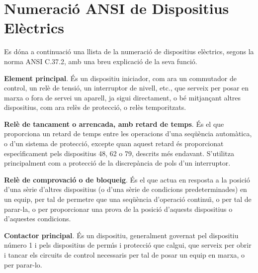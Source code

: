 \chapter{Numeraci\'{o} \textsf{ANSI} de Dispositius El\`{e}ctrics} 

Es d\'{o}na a continuaci\'{o} una llista de la numeraci\'{o} de dispositius
el\`{e}ctrics, segons la norma \textsf{ANSI C.37.2}, amb una breu
explicaci\'{o} de la seva funci\'{o}.

\begin{multicols}{2}
\begin{list}{}
{\setlength{\labelwidth}{6mm} \setlength{\leftmargin}{6mm}
\setlength{\labelsep}{2mm}}

\item[\textbf{1}]  \textbf{Element principal}. \'{E}s un dispositiu
iniciador, com ara un commutador de control, un rel\`{e} de tensi\'{o}, un
interruptor de nivell, etc., que serveix per posar en marxa o fora
de servei un aparell, ja sigui directament, o b\'{e}  mitjan\c{c}ant altres
dispositius, com ara rel\`{e}s de protecci\'{o}, o rel\`{e}s temporitzats.

\item[\textbf{2}]  \textbf{Rel\`{e}
de tancament o arrencada, amb retard de temps}. \'{E}s el que
proporciona un retard de temps entre les operacions d'una seq\"{u}\`{e}ncia
autom\`{a}tica, o d'un sistema de protecci\'{o}, excepte quan aquest retard
\'{e}s proporcionat espec\'{\i}ficament pels dispositius 48, 62 o 79,
descrits m\'{e}s endavant. S'utilitza principalment com a protecci\'{o} de
la discrep\`{a}ncia de pols d'un interruptor.

\item[\textbf{3}]  \textbf{Rel\`{e} de comprovaci\'{o} o
de bloqueig}. \'{E}s el que actua en resposta a la posici\'{o} d'una s\`{e}rie
d'altres dispositius (o d'una s\`{e}rie de condicions predeterminades)
en un equip, per tal de permetre que una seq\"{u}\`{e}ncia d'operaci\'{o}
continu\"{\i}, o per tal de parar-la, o per proporcionar una prova de la
posici\'{o} d'aquests dispositius o d'aquestes condicions.

\item[\textbf{4}]  \textbf{Contactor principal}. \'{E}s un dispositiu,
generalment governat pel dispositiu n\'{u}mero 1 i pels dispositius de perm\'{\i}s i protecci\'{o}
que calgui, que serveix per obrir i tancar els circuits de control necessaris per tal de
posar un equip en marxa, o per parar-lo.


\end{list}
\end{multicols}
